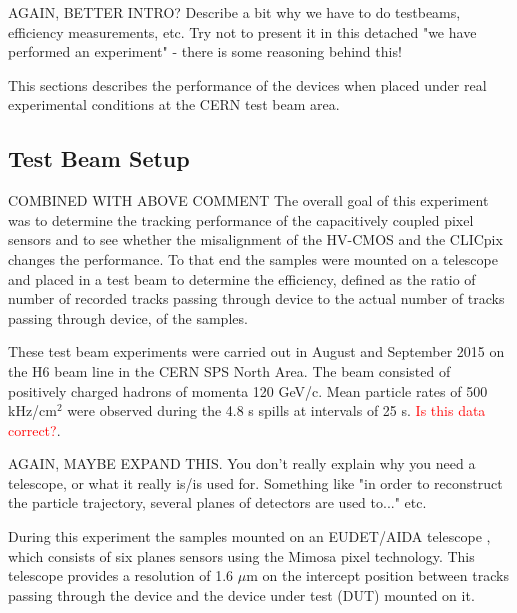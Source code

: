 AGAIN, BETTER INTRO? Describe a bit why we have to do testbeams, efficiency measurements, etc. Try not to present it in this detached "we have performed an experiment" - there is some reasoning behind this! 

This sections describes the performance of the devices when placed under real experimental conditions at the CERN test beam area.  


\subsection{Test Beam Setup}

COMBINED WITH ABOVE COMMENT
The overall goal of this experiment was to determine the tracking performance of the capacitively coupled pixel sensors and to see whether the misalignment of the HV-CMOS and the CLICpix changes the performance.  To that end the samples were mounted on a telescope and placed in a test beam to determine the efficiency, defined as the ratio of number of recorded tracks passing through device to the actual number of tracks passing through device, of the samples.  

These test beam experiments were carried out in August and September 2015 on the H6 beam line in the CERN SPS North Area.  The beam consisted of positively charged hadrons of momenta 120 GeV/c.  Mean particle rates of 500 kHz/cm$^{2}$ were observed during the 4.8 s spills at intervals of 25 s.  \textcolor{red}{Is this data correct?}.

AGAIN, MAYBE EXPAND THIS. You don't really explain why you need a telescope, or what it really is/is used for. Something like "in order to reconstruct the particle trajectory, several planes of detectors are used to..." etc.

During this experiment the samples mounted on an EUDET/AIDA telescope \cite{Rubinskiy:2000287}, which consists of six planes sensors using the Mimosa pixel technology.  This telescope provides a resolution of 1.6 $\mu$m on the intercept position between tracks passing through the device and the device under test (DUT) mounted on it.  


